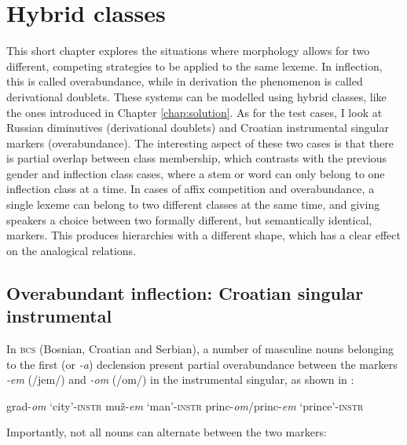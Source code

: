 \chapter{Hybrid classes}\label{chap:hybrid}

This short chapter explores the situations where morphology allows for two different, competing strategies to be applied to the same lexeme. In inflection, this is called overabundance, while in derivation the phenomenon is called derivational doublets. These systems can be modelled using hybrid classes, like the ones introduced in Chapter \ref{chap:solution}. As for the test cases, I look at Russian diminutives (derivational doublets) and Croatian instrumental singular markers (overabundance). The interesting aspect of these two cases is that there is partial overlap between class membership, which contrasts with the previous gender and inflection class cases, where a stem or word can only belong to one inflection class at a time. In cases of affix competition and overabundance, a single lexeme can belong to two different classes at the same time, and giving speakers a choice between two formally different, but semantically identical, markers. This produces hierarchies with a different shape, which has a clear effect on the analogical relations.

\section{Overabundant inflection: Croatian singular instrumental}


In \textsc{bcs} (Bosnian, Croatian and Serbian), a number of masculine nouns belonging to the first (or \textit{-a}) declension present partial overabundance between the markers \textit{-em} (/jem/) and \textit{-om} (/om/) in the instrumental singular, as shown in :

\begin{exe}
    \ex \label{exe-over-croat}
    \begin{xlist}
        \ex grad-\textit{om} `city'-\textsc{instr}
        \ex muž-\textit{em} `man'-\textsc{instr}
        \ex princ-\textit{om}/princ-\textit{em} `prince'-\textsc{instr}
    \end{xlist}
\end{exe}

Importantly, not all nouns can alternate between the two markers:

\begin{exe}
    \ex \label{no-over-croat}
    \begin{xlist}
    \end{xlist}
\end{exe}


